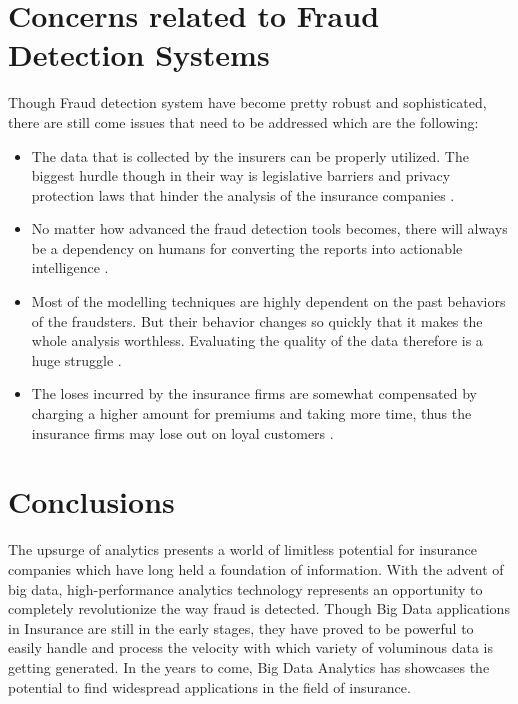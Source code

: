 \documentclass[sigconf]{acmart}
\begin{document}
\section{Concerns related to Fraud Detection Systems}
Though Fraud detection system have become pretty robust and sophisticated, there are still come issues that need to be addressed which are the following:
\begin{itemize}
  \item The data that is collected by the insurers can be properly utilized. The biggest hurdle though in their way is legislative barriers and privacy protection laws that  hinder the analysis of the insurance companies \cite{link8}.
  \item No matter how advanced the fraud detection tools becomes, there will always be a dependency on humans for converting the reports into actionable intelligence \cite{link8}.
  \item Most of the modelling techniques are highly dependent on the past behaviors of the fraudsters. But their behavior changes so quickly that it makes the whole analysis worthless. Evaluating the quality of the data therefore is a huge struggle \cite{link11}.
  \item The loses incurred by the insurance firms are somewhat compensated by charging a higher amount for premiums and taking more time, thus the insurance firms may lose out on loyal customers \cite{link8}.
\end{itemize} 


\section{Conclusions}
The upsurge of analytics presents a world of limitless potential for insurance companies which have long held a foundation of information.  With the advent of big data, high-performance analytics technology represents an opportunity to completely revolutionize the way fraud is detected. Though Big Data applications in Insurance are still in the early stages, they have proved to be powerful to easily handle and process the velocity with which variety of voluminous data is getting generated. In the years to come, Big Data Analytics has showcases the potential to find widespread applications in the field of insurance.


 
\end{document}
